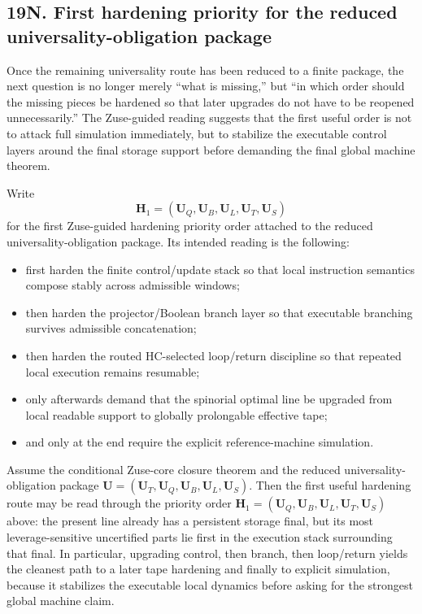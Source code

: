 \subsection*{19N. First hardening priority for the reduced universality-obligation package}
Once the remaining universality route has been reduced to a finite package, the next question is no longer merely ``what is missing,'' but ``in which order should the missing pieces be hardened so that later upgrades do not have to be reopened unnecessarily.'' The Zuse-guided reading suggests that the first useful order is not to attack full simulation immediately, but to stabilize the executable control layers around the final storage support before demanding the final global machine theorem.

\begin{definition}
Write
\[
\mathbf H_1=(\mathbf U_Q,\mathbf U_B,\mathbf U_L,\mathbf U_T,\mathbf U_S)
\]
for the first Zuse-guided hardening priority order attached to the reduced universality-obligation package. Its intended reading is the following:
\begin{itemize}[leftmargin=2em]
 \item first harden the finite control/update stack so that local instruction semantics compose stably across admissible windows;
 \item then harden the projector/Boolean branch layer so that executable branching survives admissible concatenation;
 \item then harden the routed HC-selected loop/return discipline so that repeated local execution remains resumable;
 \item only afterwards demand that the spinorial optimal line be upgraded from local readable support to globally prolongable effective tape;
 \item and only at the end require the explicit reference-machine simulation.
\end{itemize}
\end{definition}

\begin{proposition}
Assume the conditional Zuse-core closure theorem and the reduced universality-obligation package $\mathbf U=(\mathbf U_T,\mathbf U_Q,\mathbf U_B,\mathbf U_L,\mathbf U_S)$. Then the first useful hardening route may be read through the priority order $\mathbf H_1=(\mathbf U_Q,\mathbf U_B,\mathbf U_L,\mathbf U_T,\mathbf U_S)$ above: the present line already has a persistent storage final, but its most leverage-sensitive uncertified parts lie first in the execution stack surrounding that final. In particular, upgrading control, then branch, then loop/return yields the cleanest path to a later tape hardening and finally to explicit simulation, because it stabilizes the executable local dynamics before asking for the strongest global machine claim.
\end{proposition}

